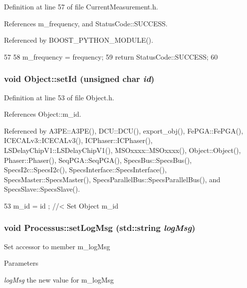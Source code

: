 Definition at line 57 of file CurrentMeasurement.h.

References m\_\-frequency, and StatusCode::SUCCESS.

Referenced by BOOST\_\-PYTHON\_\-MODULE().


\begin{DoxyCode}
57                                                  {
58     m_frequency = frequency;
59     return StatusCode::SUCCESS;
60   }
\end{DoxyCode}
\hypertarget{classObject_a398fe08cba594a0ce6891d59fe4f159f}{
\subsubsection[{setId}]{\setlength{\rightskip}{0pt plus 5cm}void Object::setId (unsigned char {\em id})}}
\label{classObject_a398fe08cba594a0ce6891d59fe4f159f}


Definition at line 53 of file Object.h.

References Object::m\_\-id.

Referenced by A3PE::A3PE(), DCU::DCU(), export\_\-obj(), FePGA::FePGA(), ICECALv3::ICECALv3(), ICPhaser::ICPhaser(), LSDelayChipV1::LSDelayChipV1(), MSOxxxx::MSOxxxx(), Object::Object(), Phaser::Phaser(), SeqPGA::SeqPGA(), SpecsBus::SpecsBus(), SpecsI2c::SpecsI2c(), SpecsInterface::SpecsInterface(), SpecsMaster::SpecsMaster(), SpecsParallelBus::SpecsParallelBus(), and SpecsSlave::SpecsSlave().


\begin{DoxyCode}
53 { m_id    = id    ; } //< Set Object m_id
\end{DoxyCode}
\hypertarget{classProcessus_a471833f89047aa9a7ff6200a31c17a1d}{
\subsubsection[{setLogMsg}]{\setlength{\rightskip}{0pt plus 5cm}void Processus::setLogMsg (std::string {\em logMsg})}}
\label{classProcessus_a471833f89047aa9a7ff6200a31c17a1d}
Set accessor to member m\_\-logMsg 
\begin{DoxyParams}{Parameters}
\item[{\em logMsg}]the new value for m\_\-logMsg \end{DoxyParams}


